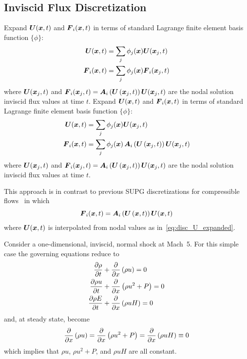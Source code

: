 \documentclass[compress,11pt]{beamer}
\begin{document}
\subsection{Inviscid Flux Discretization}
\frame
{
  \small
  {
    Expand ${\boldsymbol{U}}({\boldsymbol{x}},t)$ and ${\boldsymbol{F}}_i({\boldsymbol{x}},t)$ in terms of standard Lagrange finite element basis function
    $\{\phi\}$:
    \begin{align}
      {\boldsymbol{U}}  ({\boldsymbol{x}},t) &= \sum_j \phi_j({\boldsymbol{x}}) {\boldsymbol{U}}({\boldsymbol{x}}_j,t)   \label{eq:disc_U_expanded} \\
      {\boldsymbol{F}}_i({\boldsymbol{x}},t) &= \sum_j \phi_j({\boldsymbol{x}}) {\boldsymbol{F}}_i({\boldsymbol{x}}_j,t) \label{eq:disc_F_expanded}
    \end{align}
    where ${\boldsymbol{U}}({\boldsymbol{x}}_j,t)$ and ${\boldsymbol{F}}_i({\boldsymbol{x}}_j,t)={\boldsymbol{A}}_i\left({\boldsymbol{U}}\left({\boldsymbol{x}}_j,t\right)\right){\boldsymbol{U}}({\boldsymbol{x}}_j,t)$ are the nodal solution inviscid flux values at time $t$.
  }
  {
    Expand ${\boldsymbol{U}}({\boldsymbol{x}},t)$ and ${\boldsymbol{F}}_i({\boldsymbol{x}},t)$ in terms of standard Lagrange finite element basis function
    $\{\phi\}$:
    \begin{align}
      {\boldsymbol{U}}  ({\boldsymbol{x}},t) &= \sum_j \phi_j({\boldsymbol{x}}) {\boldsymbol{U}}({\boldsymbol{x}}_j,t)   \label{eq:disc_U_expanded} \\
      {\boldsymbol{F}}_i({\boldsymbol{x}},t) &= \sum_j \phi_j({\boldsymbol{x}})\, {\boldsymbol{A}}_i\left({\boldsymbol{U}}\left({\boldsymbol{x}}_j,t\right)\right){\boldsymbol{U}}({\boldsymbol{x}}_j,t) \label{eq:disc_F=AU_expanded}
    \end{align}
    where ${\boldsymbol{U}}({\boldsymbol{x}}_j,t)$ and ${\boldsymbol{F}}_i({\boldsymbol{x}}_j,t)={\boldsymbol{A}}_i\left({\boldsymbol{U}}\left({\boldsymbol{x}}_j,t\right)\right){\boldsymbol{U}}({\boldsymbol{x}}_j,t)$ are the nodal solution inviscid flux values at time $t$.
  }
  
  {
    \vspace{1.5em}
    This approach is in contrast to previous SUPG discretizations for compressible flows~\cite{hauke_hughes_compressible_variables,gjlebeau_thesis,skaliabadi_dissertation} in which
    \begin{equation}
      {\boldsymbol{F}}_i({\boldsymbol{x}},t) = {\boldsymbol{A}}_i\left({\boldsymbol{U}}\left({\boldsymbol{x}},t\right)\right){\boldsymbol{U}}({\boldsymbol{x}},t) \label{eq:disc_F=AU_expanded_standard}
    \end{equation}
    where ${\boldsymbol{U}}({\boldsymbol{x}},t)$ is interpolated from nodal values as in~\eqref{eq:disc_U_expanded}.
  }
}

\frame
{
  \small
  Consider a one-dimensional, inviscid, normal shock at Mach~5.  For this simple case the governing equations reduce to
  \begin{align*}
    {\frac{\partial{\rho}}{\partial{t}}} &+ {\frac{\partial{}}{\partial{x}}} \left(\rho u\right) = 0 \\
    {\frac{\partial{\rho u}}{\partial{t}}} &+ {\frac{\partial{}}{\partial{x}}}\left(\rho u^2 + P\right) = 0 \\
    {\frac{\partial{\rho E}}{\partial{t}}} &+ {\frac{\partial{}}{\partial{x}}} \left(\rho u H\right) = 0
  \end{align*}
  and, at steady state, become
  \begin{equation}
    {\frac{\partial{}}{\partial{x}}} \left(\rho u\right) = {\frac{\partial{}}{\partial{x}}} \left(\rho u^2 + P\right) = {\frac{\partial{}}{\partial{x}}} \left(\rho u H\right) \equiv 0 \label{eq:1d_steady_NS}
  \end{equation}
  which implies that $\rho u$, $\rho u^2+P$, and $\rho u H$ are all constant.
}
\end{document}

